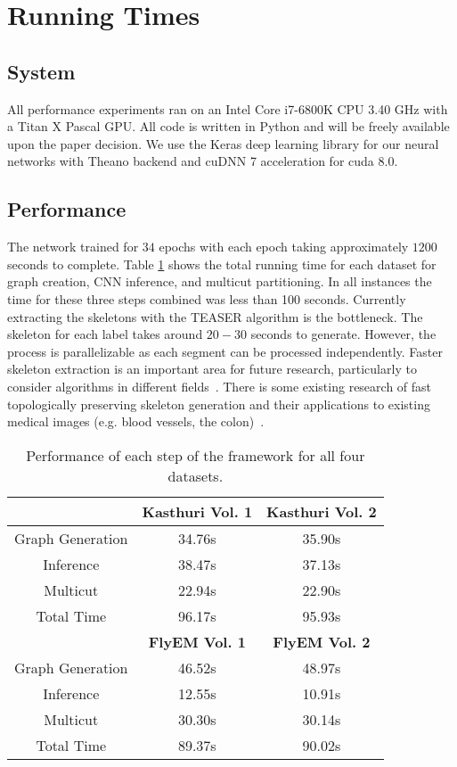 \section{Running Times}

\subsection{System}

All performance experiments ran on an Intel Core i7-6800K CPU 3.40 GHz with a Titan X Pascal GPU. 
All code is written in Python and will be freely available upon the paper decision.
We use the Keras deep learning library for our neural networks with Theano backend and cuDNN 7 acceleration for cuda 8.0. 

\subsection{Performance}

The network trained for $34$ epochs with each epoch taking approximately $1200$ seconds to complete.
Table \ref{table:performance} shows the total running time for each dataset for graph creation, CNN inference, and multicut partitioning. 
In all instances the time for these three steps combined was less than 100 seconds.
Currently extracting the skeletons with the TEASER algorithm is the bottleneck.
The skeleton for each label takes around $20-30$ seconds to generate. 
However, the process is parallelizable as each segment can be processed independently.
Faster skeleton extraction is an important area for future research, particularly to consider algorithms in different fields~\cite{fazekas2008skeletonization}.
There is some existing research of fast topologically preserving skeleton generation and their applications to existing medical images (e.g. blood vessels, the colon)~\cite{palagyi2001sequential}.

\begin{table}[t]
	\centering
	\small
	\begin{tabular}{c c c } \hline
		& \textbf{Kasthuri Vol. 1} & \textbf{Kasthuri Vol. 2} \\ \hline
		Graph Generation & 34.76s & 35.90s \\
		Inference & 38.47s & 37.13s \\
		Multicut & 22.94s & 22.90s \\ \hline
		Total Time & 96.17s & 95.93s \\ \hline
		& \textbf{FlyEM Vol. 1} & \textbf{FlyEM Vol. 2} \\ \hline
		Graph Generation & 46.52s & 48.97s \\
		Inference & 12.55s & 10.91s \\
		Multicut & 30.30s & 30.14s \\ \hline
		Total Time & 89.37s & 90.02s \\ \hline
	\end{tabular}
	\caption{Performance of each step of the framework for all four datasets.}
	\label{table:performance}
\end{table}
